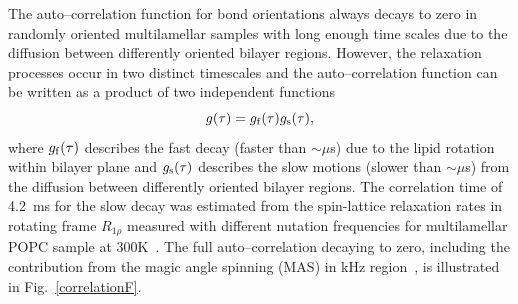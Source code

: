 \documentclass[aps,prl,superscriptaddress,twocolumn]{revtex4}
\begin{document}
The auto--correlation function for bond orientations always decays to zero
in randomly oriented multilamellar samples with long enough time scales due to the
diffusion between differently oriented bilayer regions. 
However, the relaxation processes occur in two distinct timescales and the auto--correlation function
can be written as a product of two independent functions~\cite{halle81,ferreira15}
\begin{equation}\label{corrF}
g(\tau)=g_{\rm{f}}(\tau) g_{\rm{s}}(\tau),
\end{equation}
where $g_{\rm{f}}(\tau)$ describes the fast decay (faster than $\sim \mu$s) due  
to the lipid rotation within bilayer plane and $g_{\rm{s}}(\tau)$ describes the slow motions (slower than $\sim \mu$s)
from the diffusion between differently oriented bilayer regions.
The correlation time of 4.2~ms for the slow decay was estimated from the spin-lattice relaxation rates in 
rotating frame $R_{1\rho}$ measured with different nutation frequencies for multilamellar POPC sample at 300K~\cite{ferreira15}.
The full auto--correlation decaying to zero, including the contribution from the magic angle spinning (MAS) in kHz region~\cite{nowacka10},
is illustrated in Fig.~\ref{correlationF}. 
\end{document}
